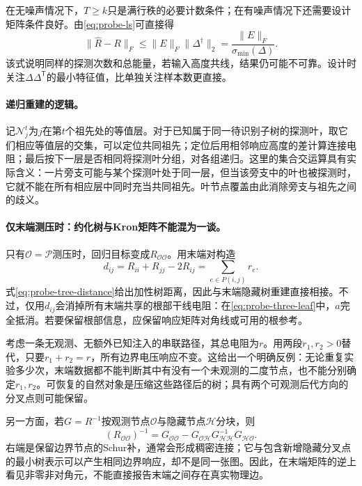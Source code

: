 \documentclass[UTF8,11pt,fontset=fandol]{ctexart}
\theoremstyle{remark}
\numberwithin{equation}{section}
\begin{document}
在无噪声情况下，$T\geq k$只是满行秩的必要计数条件；在有噪声情况下还需要设计矩阵条件良好。由\eqref{eq:probe-ls}可直接得
\begin{equation}
 \|\widehat R-R\|_F
 \leq \|E\|_F\|\Delta^\dagger\|_2
 =\frac{\|E\|_F}{\sigma_{\min}(\Delta)}.
 \label{eq:probe-conditioning}
\end{equation}
该式说明同样的探测次数和总能量，若输入高度共线，结果仍可能不可靠。设计时关注$\Delta\Delta^{\mathsf T}$的最小特征值，比单独关注样本数更直接。

\paragraph{递归重建的逻辑。}
记$\mathcal N_j^t$为$j$在第$t$个祖先处的等值层。对于已知属于同一待识别子树的探测叶，取它们相应等值层的交集，可以定位共同祖先；定位后用相邻响应高度的差计算连接电阻；最后按下一层是否相同将探测叶分组，对各组递归。这里的集合交运算具有实际含义：一片旁支可能与某个探测叶处于同一层，但当该旁支中的叶也被探测时，它就不能在所有相应层中同时充当共同祖先。叶节点覆盖由此消除旁支与祖先之间的歧义。

\paragraph{仅末端测压时：约化树与Kron矩阵不能混为一谈。}
只有$\mathcal O=\mathcal P$测压时，回归目标变成$R_{\mathcal O\mathcal O}$。用末端对构造
\begin{equation}
 d_{ij}=R_{ii}+R_{jj}-2R_{ij}
       =\sum_{e\in P(i,j)}r_e.
 \label{eq:probe-tree-distance}
\end{equation}
式\eqref{eq:probe-tree-distance}给出加性树距离，因此与末端隐藏树重建直接相接。不过，仅用$d_{ij}$会消掉所有末端共享的根部干线电阻：在\eqref{eq:probe-three-leaf}中，$a$完全抵消。若要保留根部信息，应保留响应矩阵对角线或可用的根参考。

考虑一条无观测、无额外已知注入的串联路径，其总电阻为$r$。用两段$r_1,r_2>0$替代，只要$r_1+r_2=r$，所有边界电压响应不变。这给出一个明确反例：无论重复实验多少次，末端数据都不能判断其中有没有一个未观测的二度节点，也不能分别确定$r_1,r_2$。可恢复的自然对象是压缩这些路径后的树；具有两个可观测后代方向的分叉点则可能保留。

另一方面，若$G=R^{-1}$按观测节点$\mathcal O$与隐藏节点$\mathcal H$分块，则
\begin{equation}
 (R_{\mathcal O\mathcal O})^{-1}
 =G_{\mathcal O\mathcal O}
  -G_{\mathcal O\mathcal H}G_{\mathcal H\mathcal H}^{-1}
   G_{\mathcal H\mathcal O}.
 \label{eq:probe-kron}
\end{equation}
右端是保留边界节点的Schur补，通常会形成稠密连接；它与包含新增隐藏分叉点的最小树表示可以产生相同边界响应，却不是同一张图。因此，在末端矩阵的逆上看见非零非对角元，不能直接报告末端之间存在真实物理边。
\end{document}
